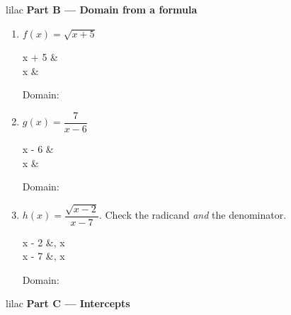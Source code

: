 \documentclass[10pt]{article}
\begin{document}
\vspace{0.16in}

\begin{headlinebox}{lilac}
\textbf{\color{plum}Part B --- Domain from a formula}
\end{headlinebox}

\begin{enumerate}[leftmargin=1.9em, itemsep=9pt, start=3]

\item $f(x) = \sqrt{x + 5}$

\begin{work}
  x + 5 & \\
      x &
\end{work}

      Domain: \ans{$[-5,\ \infty)$}

\item $g(x) = \dfrac{7}{x - 6}$

\begin{work}
  x - 6 & \\
      x &
\end{work}

      Domain: 

\item $h(x) = \dfrac{\sqrt{x - 2}}{x - 7}$. Check the radicand \emph{and} the denominator.

\begin{work}
   x - 2 &, \quad{} x  \\
   x - 7 &, \quad{} x 
\end{work}

      Domain: \ans{$[\,2, 7) \cup (7, \infty)$}

\end{enumerate}

\newpage

\begin{headlinebox}{lilac}
\textbf{\color{plum}Part C --- Intercepts}
\end{headlinebox}
\end{document}
